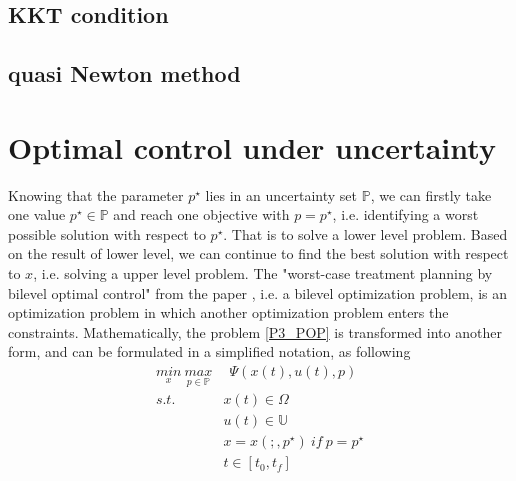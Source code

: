 \documentclass  [
  paper    = a4,
  BCOR     = 10mm,
  twoside,
  fontsize = 12pt,
  fleqn,
  toc      = bibnumbered,
  toc      = listofnumbered,
  numbers  = noendperiod,
  headings = normal,
  listof   = leveldown,
  version  = 3.03
]                                       {scrreprt}
\newcommand{\<}{\langle}
\renewcommand{\>}{\rangle}
\begin{document}
\section{KKT condition}
\section{quasi Newton method}



\chapter{Optimal control under uncertainty}
\label{Chapter3}


Knowing that the parameter $ p^\star$ lies in an uncertainty set $\mathbb{P} $, we can firstly take one value  $p^\star \in \mathbb{P}$ and  reach one objective with $p=p^\star$, i.e. identifying a worst possible solution with respect to $ p^\star $. That is to solve a lower level problem. Based on the result of lower level, we can continue to find the best solution with respect to $x$, i.e. solving a upper level problem. The "worst-case treatment planning by bilevel optimal control" from the paper  \cite{MatSch22}, i.e. a  bilevel optimization problem, is an optimization problem in which another optimization problem enters the constraints. Mathematically, the problem \ref{P3_POP} is transformed into another form, and can be formulated in a simplified notation, as following
\begin{equation}
	\begin{aligned}
		\underset{x}{min} \   \underset{p \in \mathbb{P}}{max} & \ \   \Psi(x(t), u(t), p) \\
		s.t.\ \  & x(t) \in \Omega \\
		& u(t) \in \mathbb{U}  \\
		& x = x(;,p^\star) \ if \ p = p^\star \\
		& t \in [t_0, t_f]
	\end{aligned}
	\label{P4_minmax}
\end{equation}
\end{document}

